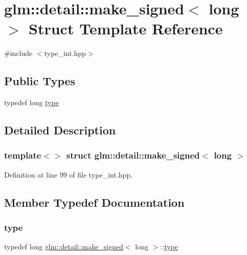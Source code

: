 \hypertarget{structglm_1_1detail_1_1make__signed_3_01long_01_4}{}\section{glm\+::detail\+::make\+\_\+signed$<$ long $>$ Struct Template Reference}
\label{structglm_1_1detail_1_1make__signed_3_01long_01_4}


{\ttfamily \#include $<$type\+\_\+int.\+hpp$>$}

\subsection*{Public Types}
\begin{DoxyCompactItemize}
\item 
typedef long \mbox{\hyperlink{structglm_1_1detail_1_1make__signed_3_01long_01_4_ab9807f0a681192166dd820195c967222}{type}}
\end{DoxyCompactItemize}


\subsection{Detailed Description}
\subsubsection*{template$<$$>$\newline
struct glm\+::detail\+::make\+\_\+signed$<$ long $>$}



Definition at line 99 of file type\+\_\+int.\+hpp.



\subsection{Member Typedef Documentation}
\mbox{\label{structglm_1_1detail_1_1make__signed_3_01long_01_4_ab9807f0a681192166dd820195c967222}} 
\subsubsection{\texorpdfstring{type}{type}}
{\footnotesize\ttfamily typedef long \mbox{\hyperlink{structglm_1_1detail_1_1make__signed}{glm\+::detail\+::make\+\_\+signed}}$<$ long $>$\+::\mbox{\hyperlink{structglm_1_1detail_1_1make__signed_3_01long_01_4_ab9807f0a681192166dd820195c967222}{type}}}



